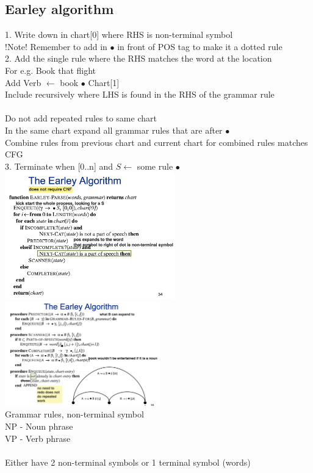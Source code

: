 \documentclass[11pt]{article}
\begin{document}
\begin{multicols*}{3}
\subsection*{Earley algorithm}
1. Write down in chart[0] where RHS is non-terminal symbol\\
!Note! Remember to add in $\bullet$ in front of POS tag to make it a dotted rule\\
2. Add the single rule where the RHS matches the word at the location\\
For e.g. Book that flight\\
	Add Verb $\leftarrow$ book $\bullet$ Chart[1]
\\
Include recursively where LHS is found in the RHS of the grammar rule
\\\\
Do not add repeated rules to same chart
\\
In the same chart expand all grammar rules that are after $\bullet$\\
Combine rules from previous chart and current chart for combined rules matches CFG \\
3. Terminate when [0..n] and $S \leftarrow$ some rule $\bullet $\\
\includegraphics[height=5.5cm]{images/w1_1}
\\
\includegraphics[height=4.5cm]{images/w2}\\
Grammar rules, non-terminal symbol\\
NP - Noun phrase\\
VP - Verb phrase\\
\\
Either have 2 non-terminal symbols or 1 terminal symbol (words)

\end{multicols*}
\end{document}
